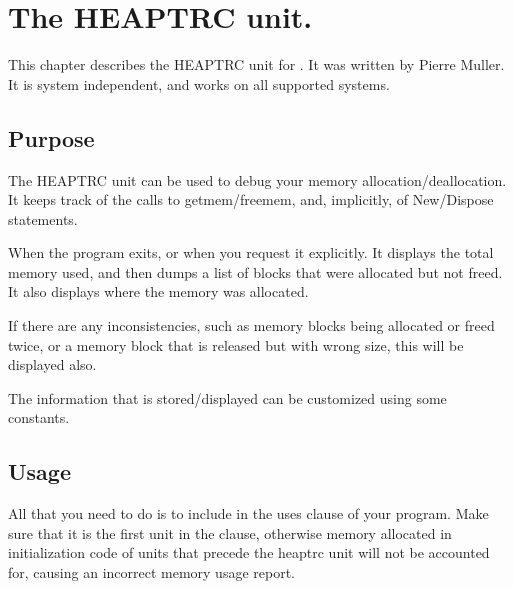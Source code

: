 %
%
%
%
%
\chapter{The HEAPTRC unit.}
This chapter describes the HEAPTRC unit for \fpc. It was written by 
Pierre Muller. It is system independent, and works on all supported systems.

\section{Purpose}

The HEAPTRC unit can be used to debug your memory allocation/deallocation.
It keeps track of the calls to getmem/freemem, and, implicitly, of
New/Dispose statements.

When the program exits, or when you request it explicitly.
It displays the total memory used, and then dumps a list of blocks that
were allocated but not freed. It also displays where the memory was
allocated.

If there are any inconsistencies, such as memory blocks being allocated
or freed twice, or a memory block that is released but with wrong size,
this will be displayed also.

The information that is stored/displayed can be customized using
some constants.


\section{Usage}

All that you need to do is to include  in the uses clause
of your program. Make sure that it is the first unit in the clause,
otherwise memory allocated in initialization code of units that precede the
heaptrc unit will not be accounted for, causing an incorrect memory usage
report.

